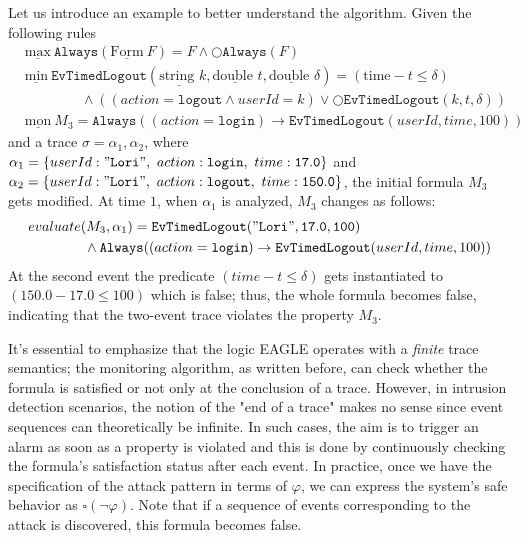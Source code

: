 \documentclass[english]{article}
\begin{document}
Let us introduce an example to better understand the algorithm. Given the following rules 
\begin{align*}
    &\underline{\text{max}}\ \mathtt{Always}(\underline{\text{Form}}\ F)  = F \land \bigcirc \mathtt{Always}(F) \\
    &\underline{\text{min}}\ \mathtt{EvTimedLogout}(\underline{\text{string }} k, \underline{\text{double }} t, \underline{\text{double }} \delta) = (\text{time} - t \leq \delta) \\
    &\quad\quad\quad\quad \land ((action = \mathtt{logout} \land userId = k) \lor \bigcirc \mathtt{EvTimedLogout}(k, t, \delta)) \\
    &\underline{\text{mon}}\ M_3  = \mathtt{Always}((action = \mathtt{login}) \rightarrow \mathtt{EvTimedLogout}(userId,time, 100))
\end{align*}
and a trace $\sigma=\alpha_1,\alpha_2$, where $\alpha_1=\{userId:\mathtt{"Lori"},\ action:\mathtt{login},\ time:\mathtt{17.0}\}$ and $\alpha_2=\{userId:\mathtt{"Lori"},\ action:\mathtt{logout},\ time:\mathtt{150.0}\}$, the initial formula $M_3$ gets modified. At time $1$, when $\alpha_1$ is analyzed, $M_3$ changes as follows:
\begin{align*}
    &evaluate(M_3,\alpha_1)  = \mathtt{EvTimedLogout("Lori",17.0, 100)} \\ 
    &\quad\quad\quad\quad \land\mathtt{Always}((action = \mathtt{login}) \rightarrow \mathtt{EvTimedLogout}(userId,time, 100))
\end{align*}
At the second event the predicate $(time-t \leq \delta)$ gets instantiated to $(150.0-17.0 \leq 100)$ which is false; thus, the whole formula becomes false, indicating that the two-event trace violates the property $M_3$. 

It's essential to emphasize that the logic EAGLE operates with a \textit{finite} trace semantics; the monitoring algorithm, as written before, can check whether the formula is satisfied or not only at the conclusion of a trace. However, in intrusion detection scenarios, the notion of the "end of a trace" makes no sense since event sequences can theoretically be infinite. In such cases, the aim is to trigger an alarm as soon as a property is violated and this is done by continuously checking the formula's satisfaction status after each event. In practice, once we have the specification of the attack pattern in terms of $\varphi$, we can express the system's safe behavior as $\square(\neg \varphi)$. Note that if a sequence of events corresponding to the attack is discovered, this formula becomes false.
\end{document}
